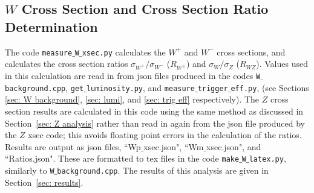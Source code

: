 \documentclass[a4paper,12pt]{article}
\begin{document}
\subsection{$W$ Cross Section and Cross Section Ratio Determination} \label{sec: W xsec}
The code \texttt{measure$\_$W$\_$xsec.py} calculates the $W^+$ and $W^-$ cross sections, and calculates the cross section ratios $\sigma_{W^+}/\sigma_{W^-}$ ($R_{W^\pm}$) and $\sigma_{W}/\sigma_{Z}$ ($R_{WZ}$). Values used in this calculation are read in from json files produced in the codes \texttt{W$\_$background.cpp}, \texttt{get$\_$luminosity.py}, and \texttt{measure$\_$trigger$\_$eff.py}, (see Sections \ref{sec: W background}, \ref{sec: lumi}, and \ref{sec: trig eff} respectively). The $Z$ cross section results are calculated in this code using the same method as discussed in Section~\ref{sec: Z analysis} rather than read in again from the json file produced by the $Z$ xsec code; this avoids floating point errors in the calculation of the ratios.
Results are output as json files, ``Wp$\_$xsec.json", ``Wm$\_$xsec.json", and ``Ratios.json". These are formatted to tex files in the code \texttt{make$\_$W$\_$latex.py}, similarly to \texttt{W$\_$background.cpp}.
The results of this analysis are given in Section~\ref{sec: results}.
\end{document}
